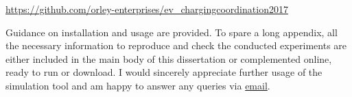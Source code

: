 \documentclass[11pt,twoside,nopardent,notitlepage,fancychap,hyper]{edengths}
\begin{document}
\begin{center}
\url{https://github.com/orley-enterprises/ev_chargingcoordination2017}
\end{center}

Guidance on installation and usage are provided. To spare a long appendix, all the necessary information to reproduce and check the conducted experiments are either included in the main body of this dissertation or complemented online, ready to run or download. I would sincerely appreciate further usage of the simulation tool and am happy to answer any queries via \href{mailto:fabian.neumann@outlook.de}{email}.

% 

\mbox{}
\thispagestyle{empty}
\newpage

\mbox{}
\thispagestyle{empty}
\newpage


\end{document}
